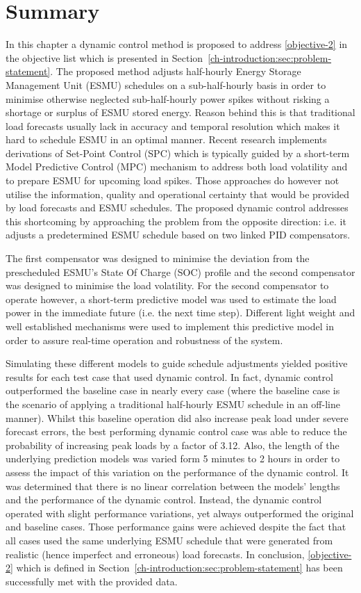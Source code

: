 \section{Summary}
\label{ch2:sec:summary}

In this chapter a dynamic control method is proposed to address \ref{objective-2} in the objective list which is presented in Section~\ref{ch-introduction:sec:problem-statement}.
The proposed method adjusts half-hourly Energy Storage Management Unit (ESMU) schedules on a sub-half-hourly basis in order to minimise otherwise neglected sub-half-hourly power spikes without risking a shortage or surplus of ESMU stored energy.
Reason behind this is that traditional load forecasts usually lack in accuracy and temporal resolution which makes it hard to schedule ESMU in an optimal manner.
Recent research implements derivations of Set-Point Control (SPC) which is typically guided by a short-term Model Predictive Control (MPC) mechanism to address both load volatility and to prepare ESMU for upcoming load spikes.
Those approaches do however not utilise the information, quality and operational certainty that would be provided by load forecasts and ESMU schedules.
The proposed dynamic control addresses this shortcoming by approaching the problem from the opposite direction: i.e. it adjusts a predetermined ESMU schedule based on two linked PID compensators.

The first compensator was designed to minimise the deviation from the prescheduled ESMU's State Of Charge (SOC) profile and the second compensator was designed to minimise the load volatility.
For the second compensator to operate however, a short-term predictive model was used to estimate the load power in the immediate future (i.e. the next time step).
Different light weight and well established mechanisms were used to implement this predictive model in order to assure real-time operation and robustness of the system.

Simulating these different models to guide schedule adjustments yielded positive results for each test case that used dynamic control.
In fact, dynamic control outperformed the baseline case in nearly every case (where the baseline case is the scenario of applying a traditional half-hourly ESMU schedule in an off-line manner).
Whilst this baseline operation did also increase peak load under severe forecast errors, the best performing dynamic control case was able to reduce the probability of increasing peak loads by a factor of 3.12.
Also, the length of the underlying prediction models was varied form 5 minutes to 2 hours in order to assess the impact of this variation on the performance of the dynamic control.
It was determined that there is no linear correlation between the models' lengths and the performance of the dynamic control.
Instead, the dynamic control operated with slight performance variations, yet always outperformed the original and baseline cases.
Those performance gains were achieved despite the fact that all cases used the same underlying ESMU schedule that were generated from realistic (hence imperfect and erroneous) load forecasts.
In conclusion, \ref{objective-2} which is defined in Section~\ref{ch-introduction:sec:problem-statement} has been successfully met with the provided data.


